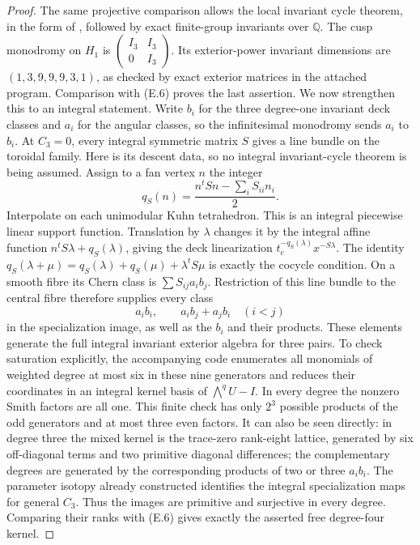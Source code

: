 \begin{proof}
The same projective comparison allows the local invariant cycle
theorem, in the form of \cite[Theorem B]{ffChen}, followed by exact
finite-group invariants over $\mathbb Q$.  The cusp monodromy on
$H_1$ is $\left(\begin{smallmatrix}I_3&I_3\\0&I_3\end{smallmatrix}\right)$.
Its exterior-power invariant dimensions are
$(1,3,9,9,9,3,1)$, as checked by exact exterior matrices in the
attached program.  Comparison with (E.6) proves the last assertion.
We now strengthen this to an integral statement.  Write $b_i$ for the
three degree-one invariant deck classes and $a_i$ for the angular
classes, so the infinitesimal monodromy sends $a_i$ to $b_i$.
At $C_3=0$, every integral symmetric matrix $S$ gives a line bundle
on the toroidal family.  Here is its descent data, so no integral
invariant-cycle theorem is being assumed.  Assign to a fan vertex $n$
the integer
\[
 q_S(n)=\frac{n^tSn-\sum_iS_{ii}n_i}{2}.
\]
Interpolate on each unimodular Kuhn tetrahedron.  This is an integral
piecewise linear support function.  Translation by $\lambda$ changes
it by the integral affine function
$n^tS\lambda+q_S(\lambda)$, giving the deck linearization
$t_c^{-q_S(\lambda)}x^{-S\lambda}$.
The identity
$q_S(\lambda+\mu)=q_S(\lambda)+q_S(\mu)+\lambda^tS\mu$
is exactly the cocycle condition.  On a smooth fibre its Chern class
is $\sum S_{ij}a_i b_j$.  Restriction of this line bundle to the
central fibre therefore supplies every class
\[
 a_i b_i,\qquad a_i b_j+a_j b_i\quad(i<j)
\]
in the specialization image, as well as the $b_i$ and their products.
These elements generate the full integral invariant exterior algebra
for three pairs.  To check saturation explicitly, the accompanying
code enumerates all monomials of weighted degree at most six in these
nine generators and reduces their coordinates in an integral kernel
basis of $\bigwedge^q U-I$.  In every degree the nonzero Smith factors
are all one.  This finite check has only $2^3$ possible products of
the odd generators and at most three even factors.  It can also be
seen directly: in degree three the mixed kernel is the trace-zero
rank-eight lattice, generated by six off-diagonal terms and two
primitive diagonal differences; the complementary degrees are
generated by the corresponding products of two or three $a_i b_i$.
The parameter isotopy already constructed identifies the integral
specialization maps for general $C_3$.  Thus the images are primitive
and surjective in every degree.  Comparing their ranks with (E.6)
gives exactly the asserted free degree-four kernel.
\end{proof}

